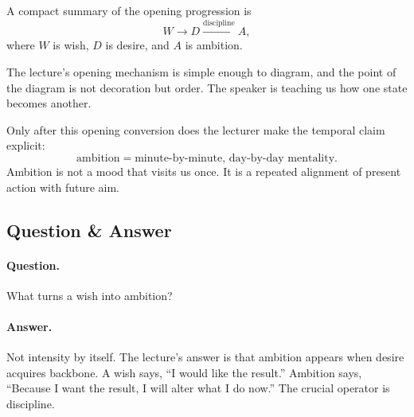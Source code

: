 A compact summary of the opening progression is
\begin{equation}
W \longrightarrow D \xrightarrow{\text{discipline}} A,
\end{equation}
where \(W\) is wish, \(D\) is desire, and \(A\) is ambition.

The lecture's opening mechanism is simple enough to diagram, and the point of the diagram is not decoration but order. The speaker is teaching us how one state becomes another.

\begin{figure}
\centering
{}
\end{figure}

Only after this opening conversion does the lecturer make the temporal claim explicit:
\begin{equation}
\text{ambition}=\text{minute-by-minute, day-by-day mentality}.
\end{equation}
Ambition is not a mood that visits us once. It is a repeated alignment of present action with future aim.

\subsection{Question \& Answer}

\paragraph{Question.} What turns a wish into ambition?

\paragraph{Answer.} Not intensity by itself. The lecture's answer is that ambition appears when desire acquires backbone. A wish says, ``I would like the result.'' Ambition says, ``Because I want the result, I will alter what I do now.'' The crucial operator is discipline.

